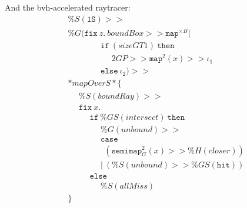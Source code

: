\documentclass{article}
\newcommand {\fix}{\mathtt{fix}}
\newcommand {\isect}{\mathtt{hit}}
\newcommand {\oneS}{\mathtt{1S}}
\newcommand {\semimap}{\mathtt{semimap}}
\newcommand {\map}{\mathtt{map}}
\newcommand {\tab}{~~~~~~}
\begin{document}
And the bvh-accelerated raytracer:
\begin{align*}
&\%S (\oneS) >> \\
&\%G(\fix~z.~ boundBox >> \map^{\times \overline{B}} ( \\
&\tab\tab\tab \mathtt{if}~(sizeGT1)~\mathtt{then}\\
&\tab\tab\tab\tab 2GP >> \map^{2}(x) >> \iota_1 \\
&\tab\tab\tab \mathtt{else}~\iota_2 ) >> \\
&*mapOverS* \{ \\
&\tab \%S(boundRay) >> \\
&\tab\fix~x. \\
&\tab\tab \mathtt{if}~\%GS(intersect)~\mathtt{then} \\
&\tab\tab\tab \%G(unbound) >> \\
&\tab\tab\tab \mathtt {case} \\
&\tab\tab\tab ~~(\semimap_G^{2}(x) >> \%H(closer)) \\
&\tab\tab\tab |~(\%S(unbound)>>\%GS(\isect)) \\
&\tab\tab \mathtt{else} \\
&\tab\tab\tab \%S(allMiss)\\
&\}
\end{align*}
\end{document}
